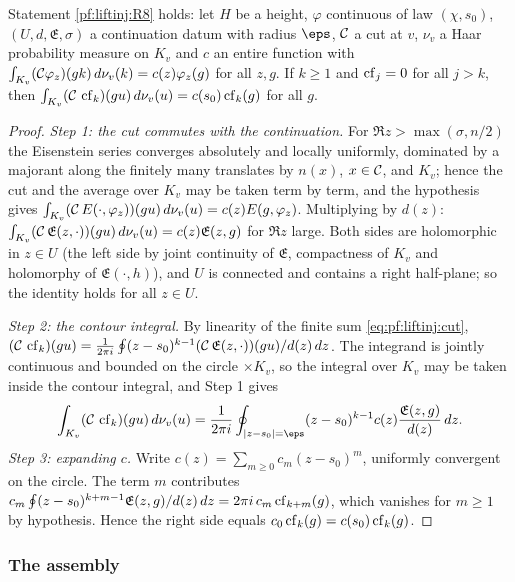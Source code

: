 \begin{lemma}\label{pf:liftinj:cfrel}
Statement \ref{pf:liftinj:R8} holds: let $H$ be a height, $\varphi$ continuous of law $(\chi,s_0)$, $(U,d,\mathfrak E,\sigma)$ a continuation datum with
radius $\eps$, $\mathcal{C}$ a cut at $v$, $\nu_v$ a Haar probability measure on $K_v$ and $c$ an entire function with
$\int_{K_v}(\mathcal{C}\varphi_z)(gk)\,d\nu_v(k)=c(z)\varphi_z(g)$ for all $z,g$. If $k\ge1$ and $\operatorname{cf}_j=0$ for all $j>k$, then
$\int_{K_v}(\mathcal{C}\,\operatorname{cf}_k)(gu)\,d\nu_v(u)=c(s_0)\operatorname{cf}_k(g)$ for all $g$.
\end{lemma}

\begin{proof}
\emph{Step 1: the cut commutes with the continuation.} For $\Re z>\max(\sigma,n/2)$ the Eisenstein series converges absolutely and locally
uniformly, dominated by a majorant along the finitely many translates by $n(x)$, $x\in\mathcal{C}$, and $K_v$; hence the cut and the average over $K_v$
may be taken term by term, and the hypothesis gives
$\int_{K_v}(\mathcal{C}\,E(\cdot,\varphi_z))(gu)\,d\nu_v(u)=c(z)E(g,\varphi_z)$. Multiplying by $d(z)$:
$\int_{K_v}(\mathcal{C}\,\mathfrak E(z,\cdot))(gu)\,d\nu_v(u)=c(z)\mathfrak E(z,g)$ for $\Re z$ large. Both sides are holomorphic in $z\in U$ (the left side
by joint continuity of $\mathfrak E$, compactness of $K_v$ and holomorphy of $\mathfrak E(\cdot,h)$), and $U$ is connected and contains a right half-plane;
so the identity holds for all $z\in U$.

\emph{Step 2: the contour integral.} By linearity of the finite sum \eqref{eq:pf:liftinj:cut},
$(\mathcal{C}\,\operatorname{cf}_k)(gu)=\frac1{2\pi i}\oint(z-s_0)^{k-1}(\mathcal{C}\,\mathfrak E(z,\cdot))(gu)/d(z)\,dz$. The integrand is jointly continuous and
bounded on the circle $\times K_v$, so the integral over $K_v$ may be taken inside the contour integral, and Step 1 gives
\[
\int_{K_v}(\liftinjcut\,\liftinjres_k)(gu)\,d\nu_v(u)=\frac1{2\pi i}\oint_{|z-s_0|=\eps}(z-s_0)^{k-1}c(z)\frac{\mathfrak E(z,g)}{d(z)}\,dz .
\]
\emph{Step 3: expanding $c$.} Write $c(z)=\sum_{m\ge0}c_m(z-s_0)^m$, uniformly convergent on the circle. The term $m$ contributes
$c_m\oint(z-s_0)^{k+m-1}\mathfrak E(z,g)/d(z)\,dz=2\pi i\,c_m\operatorname{cf}_{k+m}(g)$, which vanishes for $m\ge1$ by hypothesis. Hence the right side equals
$c_0\operatorname{cf}_k(g)=c(s_0)\operatorname{cf}_k(g)$.
\end{proof}

\subsubsection{The assembly}

